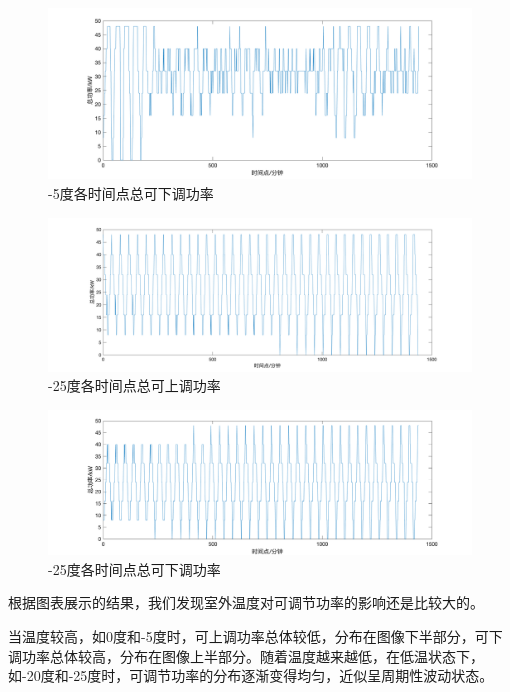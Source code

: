 \documentclass[withoutpreface,bwprint]{cumcmthesis} %
\begin{document}
    \begin{figure}[H]
    \centering
        \includegraphics[width=1\textwidth]{figures/3-3-5-down.png}
    \caption{-5度各时间点总可下调功率}
    \label{fig:my_label}
    \end{figure}
               \begin{figure}[H]
    \centering
        \includegraphics[width=1\textwidth]{figures/3-3-25-up.png}
    \caption{-25度各时间点总可上调功率}
    \label{fig:my_label}
    \end{figure}
    
    \begin{figure}[H]
    \centering
        \includegraphics[width=1\textwidth]{figures/3-3-25down.png}
    \caption{-25度各时间点总可下调功率}
    \label{fig:my_label}
    \end{figure}
    根据图表展示的结果，我们发现室外温度对可调节功率的影响还是比较大的。
    
    当温度较高，如0度和-5度时，可上调功率总体较低，分布在图像下半部分，可下调功率总体较高，分布在图像上半部分。随着温度越来越低，在低温状态下，如-20度和-25度时，可调节功率的分布逐渐变得均匀，近似呈周期性波动状态。
    
\end{document}
